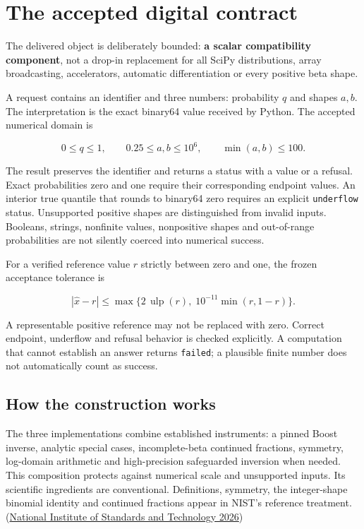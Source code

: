 \documentclass[
  10pt,
]{article}
\newcommand{\editionbreak}{\par\bigskip\Needspace{8\baselineskip}}
\begin{document}
\editionbreak

\hypertarget{the-accepted-digital-contract}{%
\section{The accepted digital
contract}\label{the-accepted-digital-contract}}

The delivered object is deliberately bounded: \textbf{a scalar
compatibility component}, not a drop-in replacement for all SciPy
distributions, array broadcasting, accelerators, automatic
differentiation or every positive beta shape.

A request contains an identifier and three numbers: probability \(q\)
and shapes \(a,b\). The interpretation is the exact binary64 value
received by Python. The accepted numerical domain is

\[
0\le q\le1,\qquad 0.25\le a,b\le10^6,\qquad \min(a,b)\le100.
\]

The result preserves the identifier and returns a status with a value or
a refusal. Exact probabilities zero and one require their corresponding
endpoint values. An interior true quantile that rounds to binary64 zero
requires an explicit \texttt{underflow} status. Unsupported positive
shapes are distinguished from invalid inputs. Booleans, strings,
nonfinite values, nonpositive shapes and out-of-range probabilities are
not silently coerced into numerical success.

For a verified reference value \(r\) strictly between zero and one, the
frozen acceptance tolerance is

\[
|\widehat x-r|\le \max\{2\,\operatorname{ulp}(r),\;10^{-11}\min(r,1-r)\}.
\]

A representable positive reference may not be replaced with zero.
Correct endpoint, underflow and refusal behavior is checked explicitly.
A computation that cannot establish an answer returns \texttt{failed}; a
plausible finite number does not automatically count as success.

\hypertarget{how-the-construction-works}{%
\subsection{How the construction
works}\label{how-the-construction-works}}

The three implementations combine established instruments: a pinned
Boost inverse, analytic special cases, incomplete-beta continued
fractions, symmetry, log-domain arithmetic and high-precision
safeguarded inversion when needed. This composition protects against
numerical scale and unsupported inputs. Its scientific ingredients are
conventional. Definitions, symmetry, the integer-shape binomial identity
and continued fractions appear in NIST's reference treatment.
(\protect\hyperlink{ref-dlmf}{National Institute of Standards and
Technology 2026})
\end{document}

